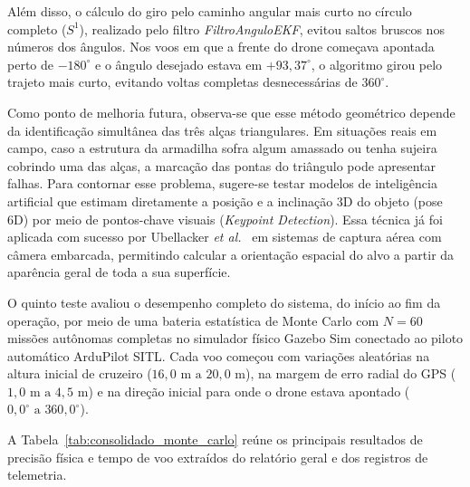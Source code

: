 Além disso, o cálculo do giro pelo caminho angular mais curto no círculo completo ($S^1$), realizado pelo filtro \textit{FiltroAnguloEKF}, evitou saltos bruscos nos números dos ângulos. Nos voos em que a frente do drone começava apontada perto de $-180^\circ$ e o ângulo desejado estava em $+93{,}37^\circ$, o algoritmo girou pelo trajeto mais curto, evitando voltas completas desnecessárias de $360^\circ$.

Como ponto de melhoria futura, observa-se que esse método geométrico depende da identificação simultânea das três alças triangulares. Em situações reais em campo, caso a estrutura da armadilha sofra algum amassado ou tenha sujeira cobrindo uma das alças, a marcação das pontas do triângulo pode apresentar falhas. Para contornar esse problema, sugere-se testar modelos de inteligência artificial que estimam diretamente a posição e a inclinação 3D do objeto (pose 6D) por meio de pontos-chave visuais (\textit{Keypoint Detection}). Essa técnica já foi aplicada com sucesso por Ubellacker \textit{et al.}~\cite{ubellacker2024} em sistemas de captura aérea com câmera embarcada, permitindo calcular a orientação espacial do alvo a partir da aparência geral de toda a sua superfície.


O quinto teste avaliou o desempenho completo do sistema, do início ao fim da operação, por meio de uma bateria estatística de Monte Carlo com $N = 60$ missões autônomas completas no simulador físico Gazebo Sim conectado ao piloto automático ArduPilot SITL. Cada voo começou com variações aleatórias na altura inicial de cruzeiro ($16{,}0\text{ m a } 20{,}0\text{ m}$), na margem de erro radial do GPS ($1{,}0\text{ m a } 4{,}5\text{ m}$) e na direção inicial para onde o drone estava apontado ($0{,}0^\circ\text{ a } 360{,}0^\circ$).

A Tabela~\ref{tab:consolidado_monte_carlo} reúne os principais resultados de precisão física e tempo de voo extraídos do relatório geral e dos registros de telemetria.

